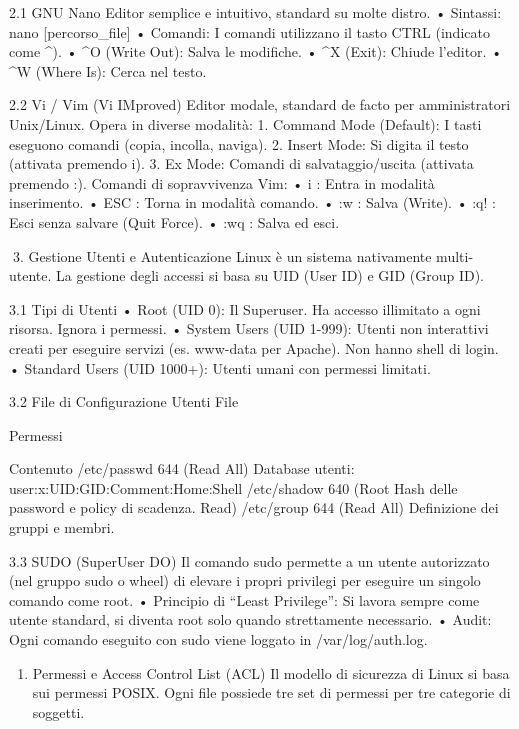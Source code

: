 \documentclass[11pt,a4paper]{article}
\providecommand{\tightlist}{%
  \setlength{\itemsep}{0pt}\setlength{\parskip}{0pt}}
\begin{document}
2.1 GNU Nano Editor semplice e intuitivo, standard su molte distro. •
Sintassi: nano {[}percorso\_file{]} • Comandi: I comandi utilizzano il
tasto CTRL (indicato come \^{}). • \^{}O (Write Out): Salva le
modifiche. • \^{}X (Exit): Chiude l'editor. • \^{}W (Where Is): Cerca
nel testo.

2.2 Vi / Vim (Vi IMproved) Editor modale, standard de facto per
amministratori Unix/Linux. Opera in diverse modalità: 1. Command Mode
(Default): I tasti eseguono comandi (copia, incolla, naviga). 2. Insert
Mode: Si digita il testo (attivata premendo i). 3. Ex Mode: Comandi di
salvataggio/uscita (attivata premendo :). Comandi di sopravvivenza Vim:
• i : Entra in modalità inserimento. • ESC : Torna in modalità comando.
• :w : Salva (Write). • :q! : Esci senza salvare (Quit Force). • :wq :
Salva ed esci.

3. Gestione Utenti e Autenticazione Linux è un sistema nativamente
multi-utente. La gestione degli accessi si basa su UID (User ID) e GID
(Group ID).

3.1 Tipi di Utenti • Root (UID 0): Il Superuser. Ha accesso illimitato a
ogni risorsa. Ignora i permessi. • System Users (UID 1-999): Utenti non
interattivi creati per eseguire servizi (es. www-data per Apache). Non
hanno shell di login. • Standard Users (UID 1000+): Utenti umani con
permessi limitati.

3.2 File di Configurazione Utenti File

Permessi

Contenuto /etc/passwd 644 (Read All) Database utenti:
user:x:UID:GID:Comment:Home:Shell /etc/shadow 640 (Root Hash delle
password e policy di scadenza. Read) /etc/group 644 (Read All)
Definizione dei gruppi e membri.

3.3 SUDO (SuperUser DO) Il comando sudo permette a un utente autorizzato
(nel gruppo sudo o wheel) di elevare i propri privilegi per eseguire un
singolo comando come root. • Principio di ``Least Privilege'': Si lavora
sempre come utente standard, si diventa root solo quando strettamente
necessario. • Audit: Ogni comando eseguito con sudo viene loggato in
/var/log/auth.log.

\begin{enumerate}
\def\labelenumi{\arabic{enumi}.}
\setcounter{enumi}{3}
\tightlist
\item
  Permessi e Access Control List (ACL) Il modello di sicurezza di Linux
  si basa sui permessi POSIX. Ogni file possiede tre set di permessi per
  tre categorie di soggetti.
\end{enumerate}
\end{document}
